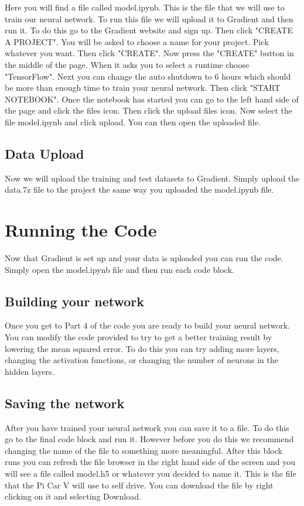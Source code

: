\documentclass[11pt]{report}
\begin{document}
Here you will find a file called model.ipynb. This is the file that we will use to train our neural network. To run this file we will upload it to Gradient and then run it.
To do this go to the Gradient website and sign up. Then click "CREATE A PROJECT". You will be asked to choose a name for your project. Pick whatever you want. Then click "CREATE". Now press the "CREATE" button in the middle of the page. When it asks you to select a runtime choose "TensorFlow". Next you can change the auto shutdown to 6 hours which should be more than enough time to train your neural network. Then click "START NOTEBOOK". Once the notebook has started you can go to the left hand side of the page and click the files icon. Then click the upload files icon. Now select the file model.ipynb and click upload. You can then open the uploaded file.

\section{Data Upload}
Now we will upload the training and test datasets to Gradient. Simply upload the data.7z file to the project the same way you uploaded the model.ipynb file.

\chapter{Running the Code}
Now that Gradient is set up and your data is uploaded you can run the code. Simply open the model.ipynb file and then run each code block.

\section{Building your network}
Once you get to Part 4 of the code you are ready to build your neural network. You can modify the code provided to try to get a better training result by lowering the mean squared error. To do this you can try adding more layers, changing the activation functions, or changing the number of neurons in the hidden layers.

\section{Saving the network}
After you have trained your neural network you can save it to a file. To do this go to the final code block and run it. However before you do this we recommend changing the name of the file to something more meaningful. After this block runs you can refresh the file browser in the right hand side of the screen and you will see a file called model.h5 or whatever you decided to name it. This is the file that the Pi Car V will use to self drive. You can download the file by right clicking on it and selecting Download. 
\end{document}
